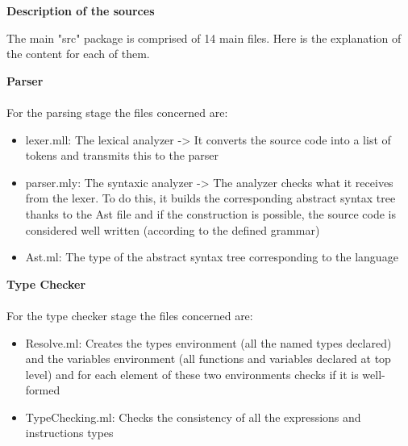 \documentclass[11pt]{report}
\begin{document}
\newpage
{}
{} 
\centerline{\textbf{\Huge Description of the sources}}
\vspace*{3pt}
\vspace*{10pt}

\tabto{1cm} The main "src" package is comprised of 14 main files. Here is the explanation of the content for each of them.

{} 
\tabto{0cm} {\LARGE \textbf{Parser}}
\\ \\
For the parsing stage the files concerned are:
\begin{itemize}
\item lexer.mll: The lexical analyzer -> It converts the source code into a list of tokens and transmits this to the parser
\item parser.mly: The syntaxic analyzer -> The analyzer checks what it receives from the lexer. To do this, it builds the corresponding abstract syntax tree thanks to the Ast file and if the construction is possible, the source code is considered well written (according to the defined grammar)
\item Ast.ml: The type of the abstract syntax tree corresponding to the language
\end{itemize}

{} 
\tabto{0cm} {\LARGE \textbf{Type Checker}}
\\ \\
For the type checker stage the files concerned are:
\begin{itemize}
\item Resolve.ml: Creates the types environment (all the named types declared) and the variables environment (all functions and variables declared at top level) and for each element of these two environments checks if it is well-formed
\item TypeChecking.ml: Checks the consistency of all the expressions and instructions types
\end{itemize}
\end{document}
